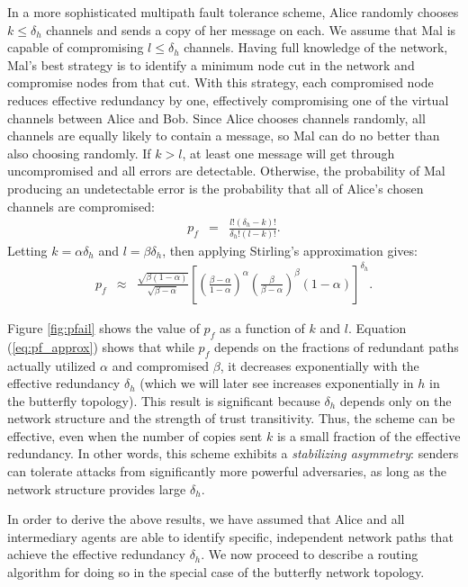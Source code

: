 \documentclass{sig-alternate-05-2015}
\newcommand{\beq}{\begin{eqnarray}}
\newcommand{\eeq}{\end{eqnarray}}
\begin{document}
In a more sophisticated multipath fault tolerance scheme,
Alice randomly chooses $k \leq \delta_h$ channels and sends a copy of
her message on each.
We assume that Mal is capable of compromising $l \leq \delta_h$ channels.
Having full knowledge of the network,
Mal's best strategy is to identify a minimum node cut in the network
and compromise nodes from that cut.
With this strategy, each compromised node reduces effective redundancy by one,
effectively compromising one of the virtual channels between Alice and Bob.
Since Alice chooses channels randomly,
all channels are equally likely to contain a message,
so Mal can do no better than also choosing randomly.
If $k > l$, at least one message will get through uncompromised and all
errors are detectable.
Otherwise, the probability of Mal producing an undetectable error is
the probability that all of Alice's chosen channels are compromised:
\beq
\label{eq:pf}
p_f &=& \frac{l!(\delta_h-k)!}{\delta_h!(l-k)!}.
\eeq
Letting $k=\alpha \delta_h$ and $l=\beta \delta_h$, then applying Stirling's
approximation gives:
\begin{eqnarray}
\label{eq:pf_approx}
p_f &\approx&
\frac{\sqrt{\beta(1-\alpha)}}{\sqrt{\beta-\alpha}}
\left[
    \left( \frac{\beta-\alpha}{1-\alpha} \right)^{\alpha}
    \left( \frac{\beta}{\beta-\alpha} \right)^{\beta}
    (1-\alpha)
\right]^{\delta_h}.
\end{eqnarray}

Figure \ref{fig:pfail} shows the value of $p_f$
as a function of $k$ and $l$.
Equation (\ref{eq:pf_approx}) shows that while $p_f$
depends on the fractions of
redundant paths actually utilized $\alpha$ and compromised $\beta$,
it decreases exponentially with the effective redundancy $\delta_h$
(which we will later see increases exponentially in $h$ in the
butterfly topology).
This result is significant because $\delta_h$
depends only on the network structure
and the strength of trust transitivity.
Thus, the scheme can be effective, even when the number of copies
sent $k$ is a small fraction of the effective redundancy.
In other words, this scheme exhibits a {\em stabilizing asymmetry}:
senders can tolerate attacks from significantly more powerful
adversaries,
as long as the network structure provides large $\delta_h$.

In order to derive the above results, we have assumed that Alice and all
intermediary agents are able to identify specific,
independent network paths that achieve the effective redundancy $\delta_h$.
We now proceed to describe a routing algorithm for doing so in the special case
of the butterfly network topology.
\end{document}
